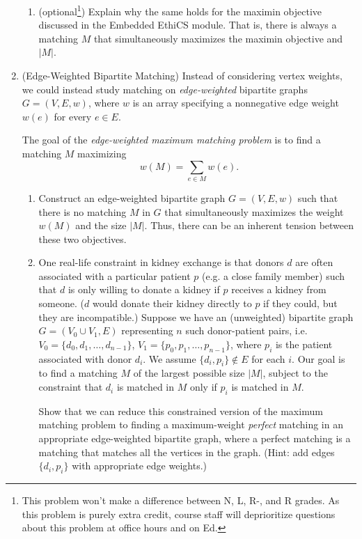 \documentclass[11pt]{article}
\begin{document}
\begin{enumerate}
\begin{enumerate}
        \item (optional\footnote{This problem won't make a difference between N, L, R-, and R grades. As this problem is purely extra credit, course staff will deprioritize questions about this problem at office hours and on Ed.}) Explain why the same holds for the maximin objective discussed in the Embedded EthiCS module.  That is, there is always a matching $M$ that simultaneously maximizes the maximin objective and $|M|$. 
        \end{enumerate}
        

\item (Edge-Weighted Bipartite Matching) 
  Instead of considering vertex weights, we could instead study matching on
{\em edge-weighted} bipartite graphs $G = (V,E,w)$, where $w$ is an array specifying a nonnegative edge weight $w(e)$ for every $e\in E$.  

   The goal of the {\em edge-weighted maximum matching problem} is to find a matching $M$ maximizing $$w(M) = \sum_{e\in M} w(e).$$
   \begin{enumerate}
    \item Construct an edge-weighted bipartite graph $G = (V,E,w)$ such that there is no matching $M$ in $G$ that simultaneously maximizes the weight $w(M)$ and the size $|M|$.  Thus, there can be an inherent tension between these two objectives. 

    \item 
    One real-life constraint in kidney exchange is that donors $d$ are often associated with a particular patient $p$ (e.g. a close family member) such that $d$ is only willing to donate a kidney if $p$ receives a kidney from someone.  ($d$ would donate their kidney directly to $p$ if they could, but they are incompatible.) 
    Suppose we have an (unweighted) bipartite graph $G=(V_0\cup V_1,E)$ representing $n$ such donor-patient pairs, i.e. $V_0=\{d_0,d_1,\ldots,d_{n-1}\}$, $V_1 = \{p_0,p_1,\ldots,p_{n-1}\}$, where $p_i$ is the patient associated with donor $d_i$. We assume $\{d_i,p_i\}\notin E$ for each $i$.   Our goal is to find a matching $M$ of the largest possible size $|M|$, subject to the constraint that $d_i$ is matched in $M$ only if $p_i$ is matched in $M$. 

    Show that we can reduce this constrained version of the maximum matching problem to finding a maximum-weight {\em perfect} matching in an appropriate edge-weighted bipartite graph, where
    a perfect matching is a matching that matches all the vertices in the graph. (Hint: add edges $\{d_i,p_i\}$ with appropriate edge weights.) 
    \end{enumerate}

\end{enumerate}
\end{document}
